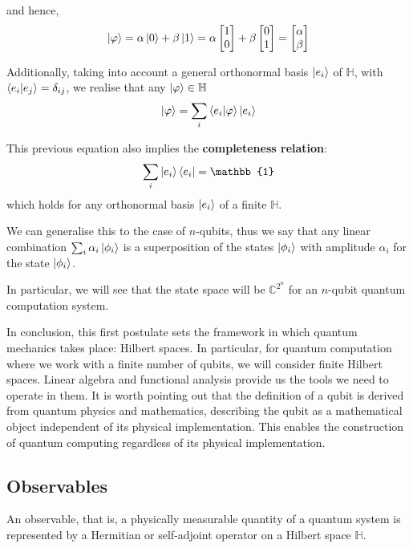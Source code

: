 and hence,
\begin{equation}
    \ket{\varphi}= \alpha \ket{0} + \beta \ket{1} = \alpha \begin{bmatrix}
    1\\
    0\\
    \end{bmatrix} + \beta \begin{bmatrix}
    0\\
    1\\
    \end{bmatrix} = \begin{bmatrix}
    \alpha\\
    \beta\\
    \end{bmatrix} 
\end{equation}

Additionally, taking into account a general orthonormal basis $\ket{e_i}$ of $\mathbb{H}$, with $\braket{e_i| e_j} = \delta_{ij}$, we realise that any $\ket{\varphi} \in \mathbb{H}$
$$\ket{\varphi} = \sum_i \braket{e_i|\varphi} \ket{e_i}$$

This previous equation also implies the \textbf{completeness relation}: $$\sum_i \ket{e_i}\bra{e_i} = \mathbb{1}$$ which holds for any orthonormal basis $\ket{e_i}$ of a finite $\mathbb{H}$.

We can generalise this to the case of $n$-qubits, thus we say that any linear combination $\sum_{i} \alpha_i \ket{\phi_i}$ is a superposition of the states $\ket{\phi_i}$ with amplitude $\alpha_i$ for the state $\ket{\phi_i}$.

In particular, we will see that the state space will be $\mathbb{C}^{2^n}$ for an $n$-qubit quantum computation system.

In conclusion, this first postulate sets the framework in which quantum mechanics takes place: Hilbert spaces. In particular, for quantum computation where we work with a finite number of qubits, we will consider finite Hilbert spaces. Linear algebra and functional analysis provide us the tools we need to operate in them. It is worth pointing out that the definition of a qubit is derived from quantum physics and mathematics, describing the qubit as a mathematical object independent of its physical implementation. This enables the construction of quantum computing regardless of its physical implementation.

\subsection{Observables} \label{sec: observables}
\begin{tcolorbox}[title=Postulate $2$]

    An observable, that is, a physically measurable quantity of a quantum system is represented by a Hermitian or self-adjoint operator on a Hilbert space $\mathbb{H}$.
\end{tcolorbox}

